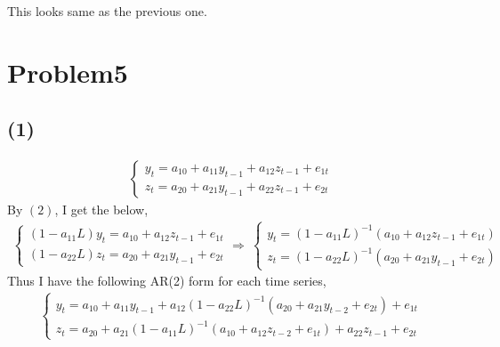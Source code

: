 \documentclass{article}
\begin{document}
This looks same as the previous one.

\section{Problem5}
\subsection{(1)}
\begin{align}
	\begin{cases}
	y_t = a_{10} + a_{11}y_{t-1} + a_{12}z_{t-1} + e_{1t}\\
	z_t = a_{20} + a_{21}y_{t-1} + a_{22}z_{t-1} + e_{2t}
	\end{cases}
\end{align}
By $(2)$, I get the below,
\begin{align}
	\begin{cases}
	(1-a_{11}L)y_t = a_{10} + a_{12}z_{t-1} + e_{1t}\\
	(1-a_{22}L)z_t = a_{20} + a_{21}y_{t-1} + e_{2t}
	\end{cases}
	\Rightarrow\ 
	\begin{cases}
	y_t = (1-a_{11}L)^{-1} \left( a_{10} + a_{12}z_{t-1} + e_{1t} \right)\\
	z_t = (1-a_{22}L)^{-1} \left( a_{20} + a_{21}y_{t-1} + e_{2t} \right)
	\end{cases}
\end{align}
Thus I have the following AR(2) form for each time series,
\begin{align}
	\begin{cases}
	y_t = a_{10} + a_{11}y_{t-1} + a_{12} (1-a_{22}L)^{-1} \left( a_{20} + a_{21}y_{t-2} + e_{2t} \right) + e_{1t}\\
	z_t = a_{20} + a_{21} (1-a_{11}L)^{-1} \left( a_{10} + a_{12}z_{t-2} + e_{1t} \right) + a_{22}z_{t-1} + e_{2t}
	\end{cases}
\end{align}
\end{document}
